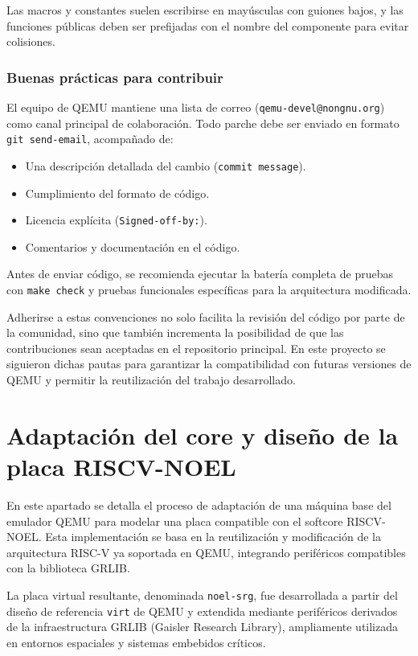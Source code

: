 Las macros y constantes suelen escribirse en mayúsculas con guiones bajos, y las funciones públicas deben ser prefijadas con el nombre del componente para evitar colisiones.

\subsubsection*{Buenas prácticas para contribuir}

El equipo de QEMU mantiene una lista de correo (\texttt{qemu-devel@nongnu.org}) como canal principal de colaboración. Todo parche debe ser enviado en formato \texttt{git send-email}, acompañado de:

\begin{itemize}
  \item Una descripción detallada del cambio (\texttt{commit message}).
  \item Cumplimiento del formato de código.
  \item Licencia explícita (\texttt{Signed-off-by:}).
  \item Comentarios y documentación en el código.
\end{itemize}

Antes de enviar código, se recomienda ejecutar la batería completa de pruebas con \texttt{make check} y pruebas funcionales específicas para la arquitectura modificada.

\vspace{1em}
Adherirse a estas convenciones no solo facilita la revisión del código por parte de la comunidad, sino que también incrementa la posibilidad de que las contribuciones sean aceptadas en el repositorio principal. En este proyecto se siguieron dichas pautas para garantizar la compatibilidad con futuras versiones de QEMU y permitir la reutilización del trabajo desarrollado.\cite{qemu_coding_style}

\section{Adaptación del core y diseño de la placa RISCV-NOEL}
\label{sec:adaptacion-noel}

En este apartado se detalla el proceso de adaptación de una máquina base del emulador QEMU para modelar una placa compatible con el softcore RISCV-NOEL. Esta implementación se basa en la reutilización y modificación de la arquitectura RISC-V ya soportada en QEMU, integrando periféricos compatibles con la biblioteca GRLIB.

La placa virtual resultante, denominada \texttt{noel-srg}, fue desarrollada a partir del diseño de referencia \texttt{virt} de QEMU y extendida mediante periféricos derivados de la infraestructura GRLIB (Gaisler Research Library), ampliamente utilizada en entornos espaciales y sistemas embebidos críticos.

